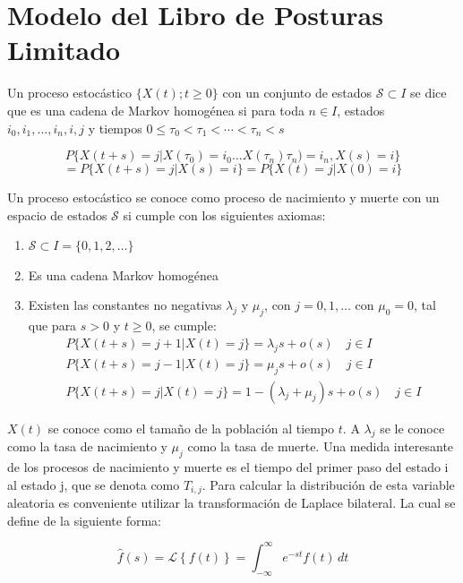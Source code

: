 \documentclass[11pt]{article}
\numberwithin{equation}{section} %
\begin{document}
\clearpage

\section{Modelo del Libro de Posturas Limitado}

Un proceso estocástico $\{X(t);t\geq 0\}$ con un conjunto de estados $\mathcal{S} \subset I$ se dice que es una cadena de Markov homogénea si para toda $n \in I$, estados $i_{0},i_{1},\ldots,i_{n},i,j$ y tiempos $0\leq\tau_0<\tau_1<\cdots<\tau_n<s$

\[
P\{X(t+s)=j|X(\tau_0)=i_0\ldots X(\tau_n)\tau_n)=i_n,X(s)=i\}
\]
\begin{equation}
= P\{X(t+s)=j|X(s)=i\} = P\{X(t)=j|X(0)=i\}
\end{equation}

Un proceso estocástico se conoce como proceso de nacimiento y muerte con un espacio de estados $\mathcal{S}$ si cumple con los siguientes axiomas:

\begin{enumerate}
  \item $\mathcal{S} \subset I = \{ 0,1,2,\ldots\}$
  \item Es una cadena Markov homogénea
  \item Existen las constantes no negativas $\lambda_j$ y $\mu_j$, con $j=0,1,\ldots$ con $\mu_0=0$, tal que para $s>0$ y $t\geq 0$, se cumple:
\begin{subequations}
\begin{eqnarray}
P\{X(t+s)=j+1|X(t)=j\} = \lambda_j s + o(s)\quad j \in I \\
P\{X(t+s)=j-1|X(t)=j\} = \mu_js + o(s)\quad j \in I \\
P\{X(t+s)=j|X(t)=j\} = 1-(\lambda_j+\mu_j)s + o(s)\quad j \in I 
\end{eqnarray}
\end{subequations}
\end{enumerate}


$X(t)$ se conoce como el tamaño de la población al tiempo $t$. A $\lambda_j$ se le conoce como la tasa de nacimiento y $\mu_j$ como la tasa de muerte. Una medida interesante de los procesos de nacimiento y muerte es el tiempo del primer paso del estado {i} al estado {j}, que se denota como $T_{i,j}$. Para calcular la distribución de esta variable aleatoria es conveniente utilizar la transformación de Laplace bilateral. La cual se define de la siguiente forma:

\begin{equation}
\hat{f}(s) = \mathcal{L} \left\{f(t)\right\}=\int_{-\infty}^{\infty} e^{-st} f(t) \,dt
\end{equation}\\
\end{document}
